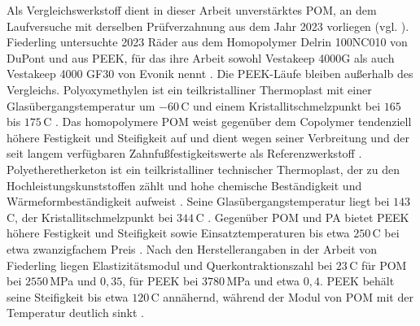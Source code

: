 Als Vergleichswerkstoff dient in dieser Arbeit unverstärktes POM, an dem Laufversuche mit derselben Prüfverzahnung aus dem Jahr 2023 vorliegen (vgl. ). Fiederling untersuchte 2023 Räder aus dem Homopolymer Delrin 100NC010 von DuPont und aus PEEK, für das ihre Arbeit sowohl Vestakeep 4000G als auch Vestakeep 4000 GF30 von Evonik nennt \cite[S.~43 bis 44]{Fie23}. Die PEEK-Läufe bleiben außerhalb des Vergleichs. Polyoxymethylen ist ein teilkristalliner Thermoplast mit einer Glasübergangstemperatur um $-60$\,\textdegree C und einem Kristallitschmelzpunkt bei $165$ bis $175$\,\textdegree C \cite[S.~79]{Erh08}. Das homopolymere POM weist gegenüber dem Copolymer tendenziell höhere Festigkeit und Steifigkeit auf und dient wegen seiner Verbreitung und der seit langem verfügbaren Zahnfußfestigkeitswerte als Referenzwerkstoff \cite[S.~66]{Has18}. Polyetheretherketon ist ein teilkristalliner technischer Thermoplast, der zu den Hochleistungskunststoffen zählt und hohe chemische Beständigkeit und Wärmeformbeständigkeit aufweist \cite[S.~43]{Fie23}. Seine Glasübergangstemperatur liegt bei $143$\,\textdegree C, der Kristallitschmelzpunkt bei $344$\,\textdegree C \cite[S.~82]{Erh08}. Gegenüber POM und PA bietet PEEK höhere Festigkeit und Steifigkeit sowie Einsatztemperaturen bis etwa $250$\,\textdegree C bei etwa zwanzigfachem Preis \cite[S.~67]{Has18}. Nach den Herstellerangaben in der Arbeit von Fiederling liegen Elastizitätsmodul und Querkontraktionszahl bei $23$\,\textdegree C für POM bei $2550$\,MPa und $0{,}35$, für PEEK bei $3780$\,MPa und etwa $0{,}4$. PEEK behält seine Steifigkeit bis etwa $120$\,\textdegree C annähernd, während der Modul von POM mit der Temperatur deutlich sinkt \cite[S.~44 bis 45]{Fie23}.



